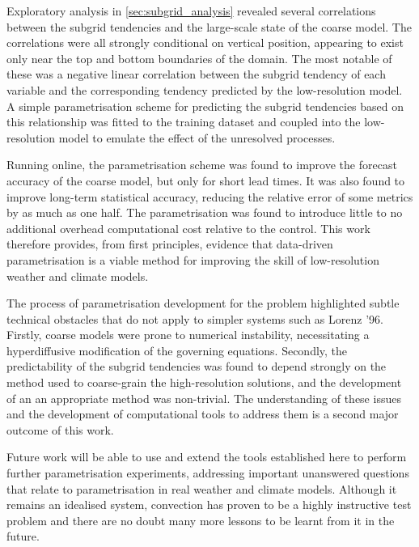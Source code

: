 \documentclass[../main.tex]{subfiles}
\begin{document}
Exploratory analysis in \cref{sec:subgrid_analysis} revealed several
correlations between the subgrid tendencies and the large-scale state of the
coarse model. The correlations were all strongly conditional on vertical
position, appearing to exist only near the top and bottom boundaries of the
domain. The most notable of these was a negative linear correlation between the
subgrid tendency of each variable and the corresponding tendency predicted by
the low-resolution model. A simple parametrisation scheme for predicting the
subgrid tendencies based on this relationship was fitted to the training
dataset and coupled into the low-resolution model to emulate the effect of the
unresolved processes.

Running online, the parametrisation scheme was found to improve the forecast
accuracy of the coarse model, but only for short lead times. It was also found
to improve long-term statistical accuracy, reducing the relative error of some
metrics by as much as one half. The parametrisation was found to introduce
little to no additional overhead computational cost relative to the control.
This work therefore provides, from first principles, evidence that data-driven
parametrisation is a viable method for improving the skill of low-resolution
weather and climate models.

The process of parametrisation development for the \rb{} problem highlighted
subtle technical obstacles that do not apply to simpler systems such as Lorenz
'96. Firstly, coarse models were prone to numerical instability, necessitating
a hyperdiffusive modification of the governing equations. Secondly, the
predictability of the subgrid tendencies was found to depend strongly on the
method used to coarse-grain the high-resolution solutions, and the development
of an an appropriate method was non-trivial. The understanding of these issues
and the development of computational tools to address them is a second major
outcome of this work.

Future work will be able to use and extend the tools established here to
perform further parametrisation experiments, addressing important
unanswered questions that relate to parametrisation in real weather and climate
models. Although it remains an idealised system, \rb{} convection has proven to
be a highly instructive test problem and there are no doubt many more lessons
to be learnt from it in the future.


\ifSubfilesClassLoaded{%
    \emergencystretch=5em
    \printbibliography{}
}{}
\end{document}

